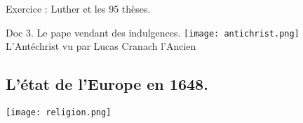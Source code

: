 \documentclass{beamer}
\begin{document}
\begin{frame}{Exercice : Luther et les 95 thèses.}
\begin{beamerboxesrounded}[scheme=blocimage]{Doc 3. Le pape vendant des indulgences.}
\texttt{[image: antichrist.png]} \\
\tiny L'Antéchrist vu par Lucas Cranach l'Ancien
\end{beamerboxesrounded}
\end{frame}

\subsection{L'état de l'Europe en 1648.}

\begin{frame}
\texttt{[image: religion.png]}
\end{frame}


  
\end{document}
